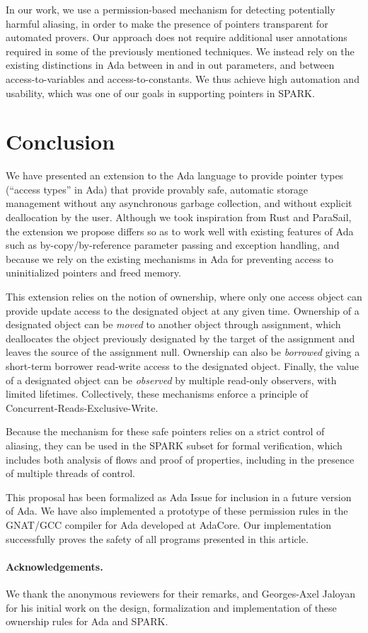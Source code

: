 \documentclass[runningheads]{llncs}
\newcommand{\keyword}[1]{\textsf{#1}}
\begin{document}
In our work, we use a permission-based mechanism for detecting potentially harmful aliasing, in order to make the presence of pointers transparent for automated provers.
Our approach does not require additional user annotations required in some of the previously mentioned techniques.  We instead rely on the existing distinctions in Ada between \keyword{in} and
\keyword{in out} parameters, and between access-to-variables and access-to-constants. We thus achieve high automation
and usability, which was one of our goals in supporting pointers in SPARK.


\section{Conclusion}
We have presented an extension to the Ada language to provide pointer types (``access types'' in Ada) that provide provably safe, automatic
storage management without any asynchronous garbage collection, and without explicit deallocation by the user. Although we took inspiration
from Rust and ParaSail, the extension we propose differs so as to work well with existing features of Ada such
as by-copy/by-reference parameter passing and exception handling, and because we rely on the existing mechanisms in Ada for preventing access
to uninitialized pointers and freed memory.

This extension relies on the notion of ownership, where only one access object can provide update access to the designated object at any given time.
Ownership of a designated object can be \textit{moved} to another object through assignment, which deallocates the object previously designated
by the target of the assignment and leaves the source of the assignment null. Ownership can also be \textit{borrowed} giving a short-term borrower read-write access to the designated object.  Finally, the value of a designated object can be \textit{observed} by multiple
read-only observers, with limited lifetimes. Collectively, these mechanisms enforce a principle of Concurrent-Reads-Exclusive-Write.

Because the mechanism for these safe pointers relies on a strict control of aliasing, they can be used in the SPARK subset for formal verification, which
includes both analysis of flows and proof of properties, including in the presence of multiple threads of control.

This proposal has been formalized as Ada Issue \cite{AI2018} for inclusion in a future version of Ada. We have also implemented a prototype of these permission rules in the GNAT/GCC
compiler for Ada developed at AdaCore. Our implementation successfully proves the safety of all programs presented in this article.

\paragraph{Acknowledgements.} We thank the anonymous reviewers for their
remarks, and Georges-Axel Jaloyan for his initial work on the design,
formalization and implementation of these ownership rules for Ada and SPARK.




\end{document}
